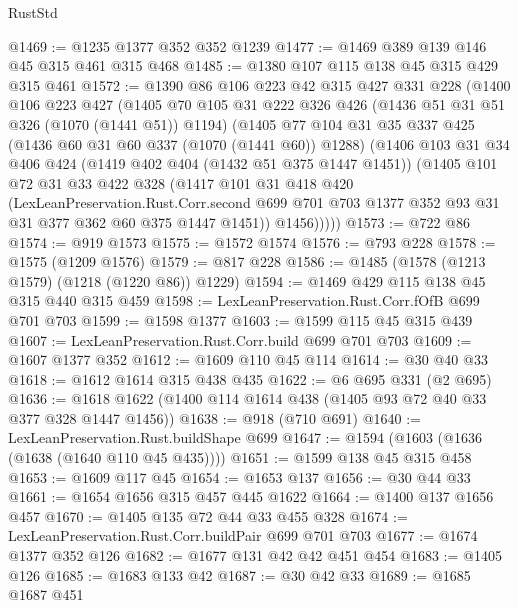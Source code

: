 \begin{lexlean}{RustStd}
\begin{coremodule}
@1469 := @1235 @1377 @352 @352 @1239
@1477 := @1469 @389 @139 @146 @45 @315 @461 @315 @468
@1485 := @1380 @107 @115 @138 @45 @315 @429 @315 @461
@1572 := @1390
    @86
    @106
    @223
    @42
    @315
    @427
    @331
    @228
    (@1400
      @106
      @223
      @427
      (@1405
        @70
        @105
        @31
        @222
        @326
        @426
        (@1436 @51 @31 @51 @326 (@1070 (@1441 @51)) @1194)
        (@1405
          @77
          @104
          @31
          @35
          @337
          @425
          (@1436 @60 @31 @60 @337 (@1070 (@1441 @60)) @1288)
          (@1406
            @103
            @31
            @34
            @406
            @424
            (@1419 @402 @404 (@1432 @51 @375 @1447 @1451))
            (@1405
              @101
              @72
              @31
              @33
              @422
              @328
              (@1417
                @101
                @31
                @418
                @420
                (LexLeanPreservation.Rust.Corr.second
                  @699
                  @701
                  @703
                  @1377
                  @352
                  @93
                  @31
                  @31
                  @377
                  @362
                  @60
                  @375
                  @1447
                  @1451))
              @1456)))))
@1573 := @722 @86
@1574 := @919 @1573
@1575 := @1572 @1574
@1576 := @793 @228
@1578 := @1575 (@1209 @1576)
@1579 := @817 @228
@1586 := @1485 (@1578 (@1213 @1579) (@1218 (@1220 @86)) @1229)
@1594 := @1469 @429 @115 @138 @45 @315 @440 @315 @459
@1598 := LexLeanPreservation.Rust.Corr.fOfB @699 @701 @703
@1599 := @1598 @1377
@1603 := @1599 @115 @45 @315 @439
@1607 := LexLeanPreservation.Rust.Corr.build @699 @701 @703
@1609 := @1607 @1377 @352
@1612 := @1609 @110 @45 @114
@1614 := @30 @40 @33
@1618 := @1612 @1614 @315 @438 @435
@1622 := @6 @695 @331 (@2 @695)
@1636 := @1618 @1622 (@1400 @114 @1614 @438 (@1405 @93 @72 @40 @33 @377 @328 @1447 @1456))
@1638 := @918 (@710 @691)
@1640 := LexLeanPreservation.Rust.buildShape @699
@1647 := @1594 (@1603 (@1636 (@1638 (@1640 @110 @45 @435))))
@1651 := @1599 @138 @45 @315 @458
@1653 := @1609 @117 @45
@1654 := @1653 @137
@1656 := @30 @44 @33
@1661 := @1654 @1656 @315 @457 @445 @1622
@1664 := @1400 @137 @1656 @457
@1670 := @1405 @135 @72 @44 @33 @455 @328
@1674 := LexLeanPreservation.Rust.Corr.buildPair @699 @701 @703
@1677 := @1674 @1377 @352 @126
@1682 := @1677 @131 @42 @42 @451 @454
@1683 := @1405 @126
@1685 := @1683 @133 @42
@1687 := @30 @42 @33
@1689 := @1685 @1687 @451

\end{coremodule}
\end{lexlean}
